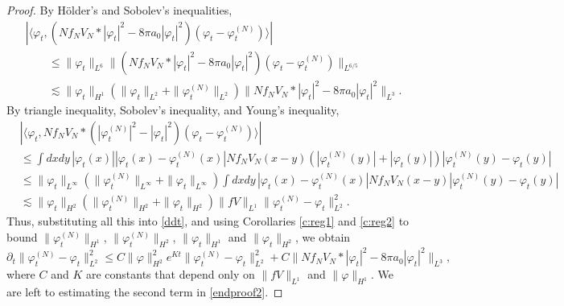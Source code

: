 \documentclass[11pt,a4paper]{scrartcl}
\begin{document}
\begin{proof}
  By H\"older's and Sobolev's inequalities,
  \begin{align*}
    & |\langle \varphi_t, (N f_N V_N * |\varphi_t|^2 - 8 \pi a_0
    |\varphi_t|^2) (\varphi_t - \varphi_t^{(N)}) \rangle| \\
    & \qquad \le \| \varphi_t \|_{L^6} \| (N f_N V_N * |\varphi_t|^2 - 8 \pi
    a_0 |\varphi_t|^2) (\varphi_t - \varphi_t^{(N)}) \|_{L^{6/5}} \\
    & \qquad \apprle \| \varphi_t \|_{H^1} (\| \varphi_t \|_{L^2} + \|
    \varphi_t^{(N)} \|_{L^2}) \| N f_N V_N * |\varphi_t|^2 - 8 \pi a_0
    |\varphi_t|^2 \|_{L^3}.
  \end{align*}
  By triangle inequality, Sobolev's inequality, and Young's inequality,
  \begin{align*}
    & |\langle \varphi_t, N f_N V_N * (|\varphi_t^{(N)}|^2 - |\varphi_t|^2)
    (\varphi_t - \varphi_t^{(N)}) \rangle| \\
    & \le \int dx dy \, |\varphi_t(x)| |\varphi_t(x) - \varphi_t^{(N)}(x)| N
    f_N V_N(x-y) (|\varphi_t^{(N)}(y)| + |\varphi_t(y)|) |\varphi_t^{(N)}(y) -
    \varphi_t(y)| \\
    & \le \| \varphi_t \|_{L^\infty} ( \| \varphi_t^{(N)} \|_{L^\infty} + \|
    \varphi_t \|_{L^\infty} ) \int dx dy \, |\varphi_t(x) -
    \varphi_t^{(N)}(x)| N f_N V_N(x-y) |\varphi_t^{(N)}(y) - \varphi_t(y)| \\
    & \apprle \| \varphi_t \|_{H^2} ( \| \varphi_t^{(N)} \|_{H^2} + \|
    \varphi_t \|_{H^2} ) \| fV \|_{L^1} \| \varphi_t^{(N)} - \varphi_t
    \|_{L^2}^2.
  \end{align*}
  Thus, substituting all this into \eqref{ddt}, and using Corollaries
  \ref{c:reg1} and \ref{c:reg2} to bound $\| \varphi_t^{(N)} \|_{H^1}$, $\|
  \varphi_t^{(N)} \|_{H^2}$, $\| \varphi_t \|_{H^1}$ and $\| \varphi_t
  \|_{H^2}$, we obtain
  \begin{equation} \label{endproof2}
    \partial_t \| \varphi_t^{(N)} - \varphi_t \|_{L^2}^2 \le C \| \varphi
    \|_{H^2}^2 e^{Kt} \| \varphi_t^{(N)} - \varphi_t \|_{L^2}^2 + C \| N f_N
    V_N * |\varphi_t|^2 - 8 \pi a_0 |\varphi_t|^2 \|_{L^3},
  \end{equation}
  where $C$ and $K$ are constants that depend only on $\| fV \|_{L^1}$ and $\|
  \varphi \|_{H^1}$. We are left to estimating the second term in
  \eqref{endproof2}.



\end{proof}
\end{document}
